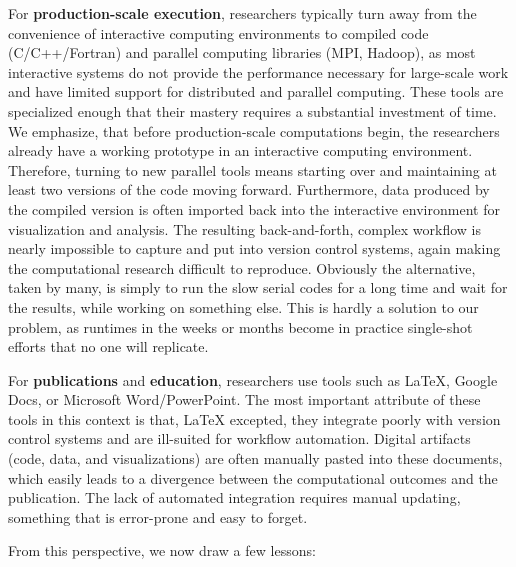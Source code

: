 \documentclass[ChapterTOCs,krantz2]{krantz} %
\begin{document}
For \textbf{production-scale execution}, researchers typically turn away from
the convenience of interactive computing environments to compiled code
(C/C++/Fortran) and parallel computing libraries (MPI, Hadoop), as most
interactive systems do not provide the performance necessary for large-scale
work and have limited support for distributed and parallel computing.  These
tools are specialized enough that their mastery requires a substantial
investment of time. We emphasize, that before production-scale computations
begin, the researchers already have a working prototype in an interactive
computing environment. Therefore, turning to new parallel tools means starting
over and maintaining at least two versions of the code moving forward.
Furthermore, data produced by the compiled version is often imported back into
the interactive environment for visualization and analysis. The resulting
back-and-forth, complex workflow is nearly impossible to capture and put into
version control systems, again making the computational research difficult to
reproduce.  Obviously the alternative, taken by many, is simply to run the slow
serial codes for a long time and wait for the results, while working on
something else.  This is hardly a solution to our problem, as runtimes in the
weeks or months become in practice single-shot efforts that no one will
replicate.

For \textbf{publications} and \textbf{education}, researchers use tools such as
\LaTeX{}, Google Docs, or Microsoft Word/PowerPoint.  The most important attribute
of these tools in this context is that, \LaTeX{} excepted, they integrate
poorly with version control systems and are ill-suited for workflow automation.
Digital artifacts (code, data, and visualizations) are often manually pasted
into these documents, which easily leads to a divergence between the
computational outcomes and the publication.  The lack of automated integration requires
manual updating, something that is error-prone and easy to forget.

From this perspective, we now draw a few lessons:
\end{document}
